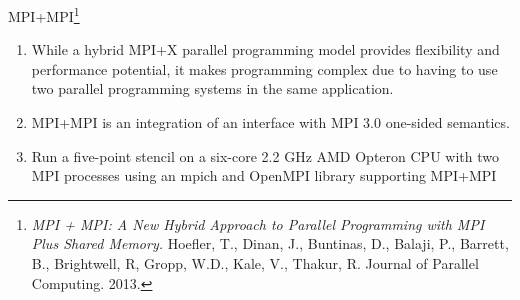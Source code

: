 \begin{frame}{MPI+MPI\footnote{\tiny {\it MPI + MPI: A New Hybrid Approach to Parallel Programming with MPI Plus Shared Memory.} Hoefler, T., Dinan, J., Buntinas, D., Balaji, P., Barrett, B., Brightwell, R, Gropp, W.D., Kale, V., Thakur, R.  Journal of 	Parallel Computing. 2013.}}
\vspace*{-.1in}
\begin{enumerate}
  \footnotesize \item \footnotesize {} While a hybrid MPI+X parallel programming model provides flexibility and performance potential, it makes programming complex due to having to use two parallel programming systems in the same application.
   \item \footnotesize {} MPI+MPI is an integration of an interface with MPI 3.0 one-sided semantics. 
   \item \footnotesize {} Run a five-point stencil on a six-core 2.2 GHz AMD Opteron CPU with two MPI processes using an mpich and OpenMPI library supporting MPI+MPI
\end{enumerate}
\vspace*{-0.3in}
\begin{figure}[ht!]
\label{fig:stencilMPIMPIbgq}
    \centering

\end{figure}
\end{frame}
